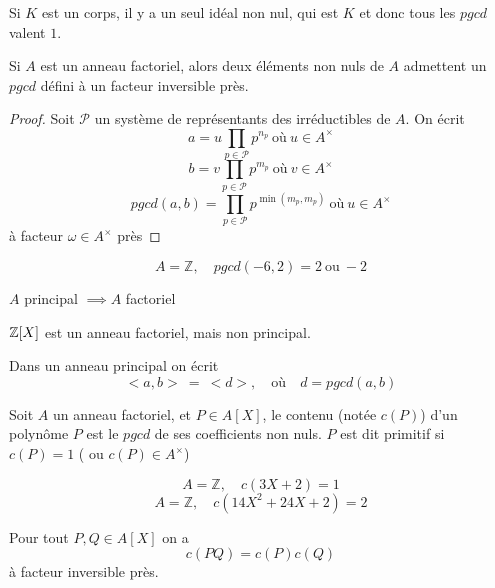 \begin{remarque}
	Si $K$ est un corps, il y a un seul idéal non nul, qui est $K$ et donc
	tous les $pgcd$ valent $1$.
\end{remarque}

\begin{prop}
	Si $A$ est un anneau factoriel, alors deux éléments non nuls de $A$ admettent un $pgcd$ défini à un facteur inversible près.
\end{prop}

\begin{proof}
	Soit $\mathcal{P}$ un système de représentants des irréductibles de $A$.
	On écrit
	$$ a = u \prod\limits_{p \in \mathcal{P} } p^{n_p} \ \text{où}\  u \in A^\times $$
	$$ b = v \prod \limits_{p \in \mathcal{P} } p^{m_p} \ \text{où}\  v \in A^\times $$
	$$ pgcd(a,b)= \prod \limits_{p \in \mathcal{P}} p^{\min(m_p, m_p)}\  \text{où} \  u \in A^\times $$
	à facteur $\omega \in A^\times$ près
\end{proof}

\begin{example}
	$$A  = \mathbb{Z}, \quad  pgcd(-6,2) = 2\ \text{ou}\ -2$$
\end{example}

\begin{theorem}[admis]
	$A$  principal $\implies A$ factoriel
\end{theorem}

\begin{example}
	$\mathbb{Z}[X]$ est un anneau factoriel, mais non principal.
\end{example}

\begin{prop}
	Dans un anneau principal on écrit
	$$ <a,b> \ = \  <d>, \quad \text{où}\quad d = pgcd (a,b) $$
\end{prop}

\begin{definition}
	Soit $A$ un anneau factoriel, et $P \in A[X]$, le contenu (notée $c(P)$) d'un polynôme $P$ est le
	$pgcd$ de ses coefficients non nuls.
	$P$ est dit primitif si $c(P)=1$ ( ou $c(P) \in A^\times$)
\end{definition}


\begin{example}
	$$A  = \mathbb{Z}, \quad  c(3X + 2) = 1$$
	$$A  = \mathbb{Z}, \quad  c(14X^2 + 24X + 2) = 2$$
\end{example}


\begin{lemma}
	Pour tout $P,Q \in A[X]$ on a
	$$ c(PQ) = c(P)c(Q)$$
	à facteur inversible près.
\end{lemma}

